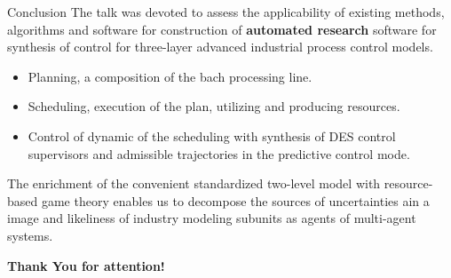 \documentclass[10pt,dvipsnames]{beamer}
\begin{document}
\begin{frame}{Conclusion}
  The talk was devoted to assess the applicability of existing methods, algorithms and software for construction of \textbf{automated research} software for synthesis of control for three-layer advanced industrial process control models.
  \begin{itemize}
  \item Planning, a composition of the bach processing line.
  \item Scheduling, execution of the plan, utilizing and producing resources.
  \item Control of dynamic of the scheduling with synthesis of DES control supervisors and admissible trajectories in the predictive control mode.
  \end{itemize}

  The enrichment of the convenient standardized two-level model with resource-based game theory enables us to decompose the sources of uncertainties ain a image and likeliness of industry modeling subunits as agents of multi-agent systems.

\end{frame}


\begin{frame}{}
  \vfill
  \centering
  \Huge \textbf{Thank You for attention!}
  \vfill
\end{frame}
\end{document}
